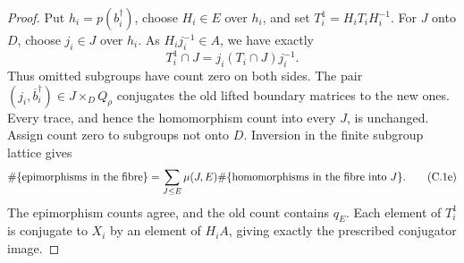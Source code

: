 \begin{proof}
Put \(h_i=p(b_i^\dagger)\), choose \(H_i\in E\) over \(h_i\),
and set \(T_i^1=H_iT_iH_i^{-1}\).
For \(J\) onto \(D\), choose \(j_i\in J\) over \(h_i\).
As \(H_ij_i^{-1}\in A\), we have exactly
\[
 T_i^1\cap J=j_i(T_i\cap J)j_i^{-1}.
 \tag{C.1d}
\]
Thus omitted subgroups have count zero on both sides.
The pair \((j_i,\overline b_i^\dagger)\in J\times_DQ_\rho\)
conjugates the old lifted boundary matrices to the new ones.
Every trace, and hence the homomorphism count into every \(J\),
is unchanged. Assign count zero to subgroups not onto \(D\).
Inversion in the finite subgroup lattice gives
\[
 \#\{\hbox{epimorphisms in the fibre}\}
   =\sum_{J\le E}\mu(J,E)
          \#\{\hbox{homomorphisms in the fibre into }J\}.
 \tag{C.1e}
\]
The epimorphism counts agree, and the old count contains \(q_E\).
Each element of \(T_i^1\) is conjugate to \(X_i\) by an element
of \(H_iA\), giving exactly the prescribed conjugator image.
\end{proof}

